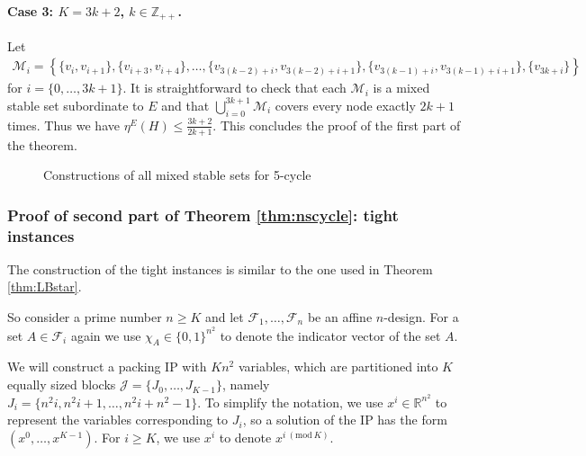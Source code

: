 \documentclass[smallextended]{svjour3}
\begin{document}
\paragraph{Case 3: $K = 3k + 2$, $k \in \mathbb{Z}_{++}$.} Let
\begin{eqnarray*}
\mathcal{M}_{i} =  \left\{ \{v_{i}, v_{i+1}\}, \{v_{i + 3}, v_{i + 4}\}, \ldots, \{v_{3(k-2)+i}, v_{3(k-2)+i + 1}\}, \{v_{3(k-1)+i}, v_{3(k-1)+i + 1}\}, \{v_{3k + i}\} \right\}
\end{eqnarray*}
for $i = \{0, \dots, 3k + 1\}$. It is straightforward to check that each $\mathcal{M}_i$ is a mixed stable set subordinate to $E$ and that $\bigcup_{i = 0}^{3k+1} \mathcal{M}_i$ covers every node exactly $2k + 1$ times. Thus we have $\eta^E(H) \le \frac{3k+2}{2k + 1}$. This concludes the proof of the first part of the theorem.

\begin{figure}[h!]
	\centering    
	\caption{Constructions of all mixed stable sets for 5-cycle}
	\label{fig5c}
\end{figure}

\subsubsection{Proof of second part of Theorem \ref{thm:nscycle}: tight instances}

	The construction of the tight instances is similar to the one used in Theorem \ref{thm:LBstar}. 
	
	So consider a prime number $n \ge K$ and let ${\mathcal{F}}_1, \ldots, {\mathcal{F}}_n$ be an affine $n$-design. For a set $A \in {\mathcal{F}}_i$ again we use $\chi_A \in \{0,1\}^{n^2}$ to denote the indicator vector of the set $A$.

	We will construct a packing IP with $K n^2$ variables, which are partitioned into $K$ equally sized blocks $\mathcal{J} = \{J_0,\ldots, J_{K - 1}\}$, namely $J_i = \{n^2 i, n^2 i + 1, \ldots, n^2 i + n^2 - 1\}$. To simplify the notation, we use $x^i \in \mathbb{R}^{n^2}$ to represent the variables corresponding to $J_i$, so a solution of the IP has the form $(x^0, \ldots, x^{K-1})$. For $i \ge K$, we use $x^i$ to denote $x^{i {\ (\text{mod}\ {K})}}$.
\end{document}
